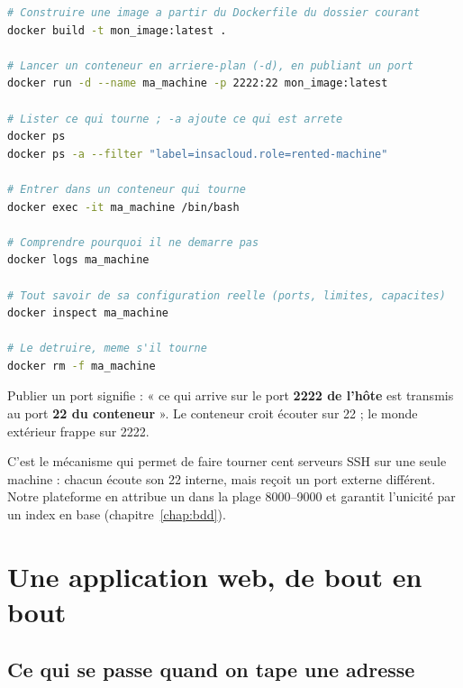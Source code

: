 \begin{lstlisting}[language=bash]
# Construire une image a partir du Dockerfile du dossier courant
docker build -t mon_image:latest .

# Lancer un conteneur en arriere-plan (-d), en publiant un port
docker run -d --name ma_machine -p 2222:22 mon_image:latest

# Lister ce qui tourne ; -a ajoute ce qui est arrete
docker ps
docker ps -a --filter "label=insacloud.role=rented-machine"

# Entrer dans un conteneur qui tourne
docker exec -it ma_machine /bin/bash

# Comprendre pourquoi il ne demarre pas
docker logs ma_machine

# Tout savoir de sa configuration reelle (ports, limites, capacites)
docker inspect ma_machine

# Le detruire, meme s'il tourne
docker rm -f ma_machine
\end{lstlisting}

\begin{notion}{Publier un port}
 signifie : « ce qui arrive sur le port \textbf{2222 de
l'hôte} est transmis au port \textbf{22 du conteneur} ». Le conteneur croit
écouter sur 22 ; le monde extérieur frappe sur 2222.

C'est le mécanisme qui permet de faire tourner cent serveurs SSH sur une seule
machine : chacun écoute son 22 interne, mais reçoit un port externe différent.
Notre plateforme en attribue un dans la plage 8000--9000 et garantit l'unicité
par un index en base (chapitre~\ref{chap:bdd}).
\end{notion}

\chapter{Une application web, de bout en bout}

\section{Ce qui se passe quand on tape une adresse}

